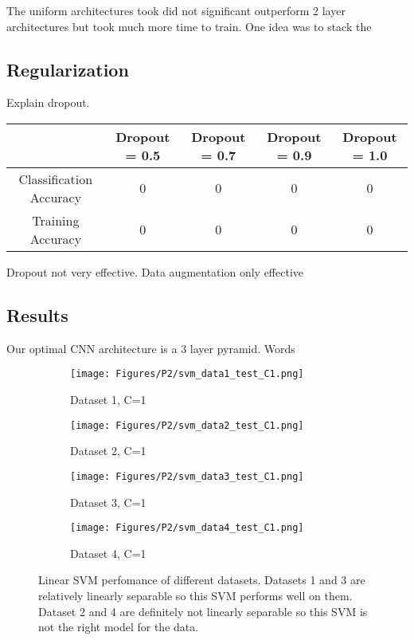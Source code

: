 \documentclass[10pt,twoside]{article}
\begin{document}
The uniform architectures took did not significant outperform 2 layer architectures but took much more time to train. One idea was to stack the 

\subsection{Regularization}

Explain dropout.

\begin{center}
 \begin{tabular}{||c c c c c||} 
 \hline
  & Dropout = 0.5 & Dropout = 0.7 & Dropout = 0.9  & Dropout = 1.0 \\ [0.5ex] 
 \hline\hline
 Classification Accuracy & 0 & 0 & 0 & 0 \\ 
 \hline
 Training Accuracy       & 0 & 0 & 0 & 0 \\
 \hline
\end{tabular}
\end{center}

Dropout not very effective.
Data augmentation only effective


\subsection{Results}
Our optimal CNN architecture is a 3 layer pyramid. Words

\begin{figure}[h]
        \begin{subfigure}[b]{0.25\textwidth}
                \centering
                \texttt{[image: Figures/P2/svm\_data1\_test\_C1.png]}
                \caption{Dataset 1, C=1}
        \end{subfigure}%
        \begin{subfigure}[b]{0.25\textwidth}
                \centering
                \texttt{[image: Figures/P2/svm\_data2\_test\_C1.png]}
                \caption{Dataset 2, C=1}
        \end{subfigure}%
        \begin{subfigure}[b]{0.25\textwidth}
                \centering
                \texttt{[image: Figures/P2/svm\_data3\_test\_C1.png]}
                \caption{Dataset 3, C=1}
        \end{subfigure}%
        \begin{subfigure}[b]{0.25\textwidth}
                \centering
                \texttt{[image: Figures/P2/svm\_data4\_test\_C1.png]}
                \caption{Dataset 4, C=1}
        \end{subfigure}
        \caption{Linear SVM perfomance of different datasets. Datasets 1 and 3 are relatively linearly separable so this SVM performs well on them. Dataset 2 and 4 are definitely not linearly separable so this SVM is not the right model for the data.}\label{fig:animals}
\end{figure}

\vfill
\end{document}
